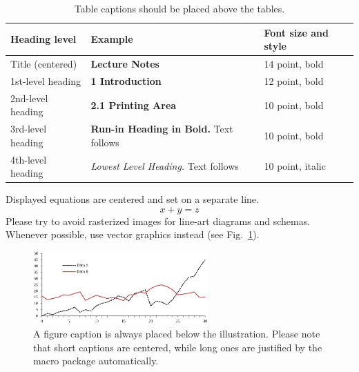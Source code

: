 \documentclass{llncs}
\begin{document}
\begin{table}
\caption{Table captions should be placed above the
tables.}\label{tab1}
\centering
\begin{tabular}{|l|l|l|}
\hline
Heading level &  Example & Font size and style\\
\hline
Title (centered) &  {\Large\bfseries Lecture Notes} & 14 point, bold\\
1st-level heading &  {\large\bfseries 1 Introduction} & 12 point, bold\\
2nd-level heading & {\bfseries 2.1 Printing Area} & 10 point, bold\\
3rd-level heading & {\bfseries Run-in Heading in Bold.} Text follows & 10 point, bold\\
4th-level heading & {\itshape Lowest Level Heading.} Text follows & 10 point, italic\\
\hline
\end{tabular}
\end{table}

\noindent Displayed equations are centered and set on a separate
line.
\begin{equation}
x + y = z
\end{equation}
Please try to avoid rasterized images for line-art diagrams and
schemas. Whenever possible, use vector graphics instead (see
Fig.~\ref{fig1}).

\begin{figure}
\includegraphics[width=0.6\textwidth]{fig1.eps}
\centering
\caption{A figure caption is always placed below the illustration.
Please note that short captions are centered, while long ones are
justified by the macro package automatically.} \label{fig1}
\end{figure}
\end{document}
